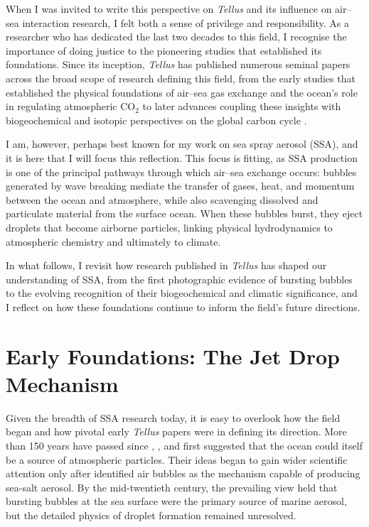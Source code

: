 \documentclass[ProofPDF]{./Styles/Jnls-Template-V3}
\begin{document}
When I was invited to write this perspective on \textit{Tellus} and its influence on air–sea interaction research, I felt both a sense of privilege and responsibility. As a researcher who has dedicated the last two decades to this field, I recognise the importance of doing justice to the pioneering studies that established its foundations. Since its inception, \textit{Tellus} has published numerous seminal papers across the broad scope of research defining this field, from the early studies that established the physical foundations of air–sea gas exchange and the ocean's role in regulating atmospheric CO$_2$
\citep{Revelle1957,Bolin1960,Broecker1974} to later advances coupling these insights with biogeochemical and isotopic perspectives on the global carbon cycle \citep{Krakauer2006}.

I am, however, perhaps best known for my work on sea spray aerosol (SSA), and it is here that I will focus this reflection. This focus is fitting, as SSA production is one of the principal pathways through which air–sea exchange occurs: bubbles generated by wave breaking mediate the transfer of gases, heat, and momentum between the ocean and atmosphere, while also scavenging dissolved and particulate material from the surface ocean. When these bubbles burst, they eject droplets that become airborne particles, linking physical hydrodynamics to atmospheric chemistry and ultimately to climate.

In what follows, I revisit how research published in \textit{Tellus} has shaped our understanding of SSA, from the first photographic evidence of bursting bubbles to the evolving recognition of their biogeochemical and climatic significance, and I reflect on how these foundations continue to inform the field’s future directions.

\section{Early Foundations: The Jet Drop Mechanism}

Given the breadth of SSA research today, it is easy to overlook how the field began and how pivotal early \textit{Tellus} papers were in defining its direction. More than 150 years have passed since \cite{Beck1819}, \cite{Sigerson1870}, and \cite{aitken1881} first suggested that the ocean could itself be a source of atmospheric particles. Their ideas began to gain wider scientific attention only after \cite{jacobs1937} identified air bubbles as the mechanism capable of producing sea-salt aerosol. By the mid-twentieth century, the prevailing view held that bursting bubbles at the sea surface were the primary source of marine aerosol, but the detailed physics of droplet formation remained unresolved.
\end{document}
